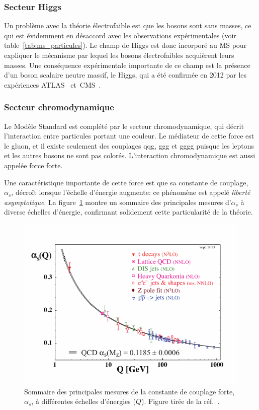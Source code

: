 \subsubsection{Secteur Higgs}
Un problème avec la théorie électrofaible est que les bosons sont sans
masses, ce qui est évidemment en désaccord avec les observations
expérimentales (voir table~\ref{tab:ms_particules}). Le champ de Higgs
est donc incorporé au MS pour expliquer le mécanisme par lequel les
bosons électrofaibles acquièrent leurs masses. Une conséquence
expérimentale importante de ce champ est la présence d'un boson
scalaire neutre massif, le Higgs, qui a été confirmée en 2012 par les
expériences ATLAS~\cite{aad_observation_2012} et~CMS~\cite{chatrchyan_observation_2012}.

\subsubsection{Secteur chromodynamique}
Le Modèle Standard est complété par le secteur chromodynamique, qui
décrit l'interaction entre particules portant une couleur. Le
médiateur de cette force est le gluon, et il existe seulement des
couplages qqg, ggg et gggg puisque les leptons et les autres bosons ne
sont pas colorés. L'interaction chromodynamique est aussi appelée
force forte.

Une caractéristique importante de cette force est que sa
constante de couplage, $\alpha_s$, décroît lorsque l'échelle d'énergie
augmente: ce phénomène est appelé \emph{liberté asymptotique}. La
figure~\ref{fig:alpha_s} montre un sommaire des principales mesures
d'$\alpha_s$ à diverse échelles d'énergie, confirmant solidement cette
particularité de la théorie.

\begin{figure}
  \centering
  \includegraphics{alpha_s.pdf}
  \caption{Sommaire des principales mesures de la constante de couplage forte, $\alpha_s$, à différentes échelles d'énergies ($Q$). Figure tirée de la réf.~\cite{olive_review_2014}.}
\label{fig:alpha_s}
\end{figure}

